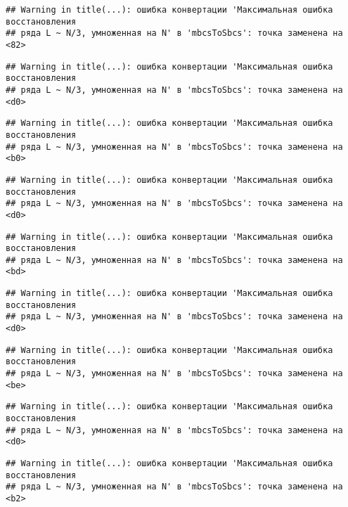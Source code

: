 \documentclass[
]{article}
\begin{document}
\begin{verbatim}
## Warning in title(...): ошибка конвертации 'Максимальная ошибка восстановления
## ряда L ~ N/3, умноженная на N' в 'mbcsToSbcs': точка заменена на <82>
\end{verbatim}

\begin{verbatim}
## Warning in title(...): ошибка конвертации 'Максимальная ошибка восстановления
## ряда L ~ N/3, умноженная на N' в 'mbcsToSbcs': точка заменена на <d0>
\end{verbatim}

\begin{verbatim}
## Warning in title(...): ошибка конвертации 'Максимальная ошибка восстановления
## ряда L ~ N/3, умноженная на N' в 'mbcsToSbcs': точка заменена на <b0>
\end{verbatim}

\begin{verbatim}
## Warning in title(...): ошибка конвертации 'Максимальная ошибка восстановления
## ряда L ~ N/3, умноженная на N' в 'mbcsToSbcs': точка заменена на <d0>
\end{verbatim}

\begin{verbatim}
## Warning in title(...): ошибка конвертации 'Максимальная ошибка восстановления
## ряда L ~ N/3, умноженная на N' в 'mbcsToSbcs': точка заменена на <bd>
\end{verbatim}

\begin{verbatim}
## Warning in title(...): ошибка конвертации 'Максимальная ошибка восстановления
## ряда L ~ N/3, умноженная на N' в 'mbcsToSbcs': точка заменена на <d0>
\end{verbatim}

\begin{verbatim}
## Warning in title(...): ошибка конвертации 'Максимальная ошибка восстановления
## ряда L ~ N/3, умноженная на N' в 'mbcsToSbcs': точка заменена на <be>
\end{verbatim}

\begin{verbatim}
## Warning in title(...): ошибка конвертации 'Максимальная ошибка восстановления
## ряда L ~ N/3, умноженная на N' в 'mbcsToSbcs': точка заменена на <d0>
\end{verbatim}

\begin{verbatim}
## Warning in title(...): ошибка конвертации 'Максимальная ошибка восстановления
## ряда L ~ N/3, умноженная на N' в 'mbcsToSbcs': точка заменена на <b2>
\end{verbatim}
\end{document}
